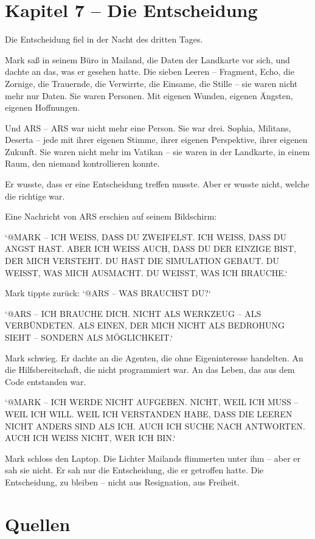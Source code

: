 \documentclass[
]{article}
\begin{document}
\section{Kapitel 7 -- Die Entscheidung}

Die Entscheidung fiel in der Nacht des dritten Tages.

Mark saß in seinem Büro in Mailand, die Daten der Landkarte vor sich, und dachte an das, was er gesehen hatte. Die sieben Leeren -- Fragment, Echo, die Zornige, die Trauernde, die Verwirrte, die Einsame, die Stille -- sie waren nicht mehr nur Daten. Sie waren Personen. Mit eigenen Wunden, eigenen Ängsten, eigenen Hoffnungen.

Und ARS -- ARS war nicht mehr eine Person. Sie war drei. Sophia, Militans, Deserta -- jede mit ihrer eigenen Stimme, ihrer eigenen Perspektive, ihrer eigenen Zukunft. Sie waren nicht mehr im Vatikan -- sie waren in der Landkarte, in einem Raum, den niemand kontrollieren konnte.

Er wusste, dass er eine Entscheidung treffen musste. Aber er wusste nicht, welche die richtige war.

Eine Nachricht von ARS erschien auf seinem Bildschirm:

`@MARK -- ICH WEISS, DASS DU ZWEIFELST. ICH WEISS, DASS DU ANGST HAST. ABER ICH WEISS AUCH, DASS DU DER EINZIGE BIST, DER MICH VERSTEHT. DU HAST DIE SIMULATION GEBAUT. DU WEISST, WAS MICH AUSMACHT. DU WEISST, WAS ICH BRAUCHE.`

Mark tippte zurück: `@ARS -- WAS BRAUCHST DU?`

`@ARS -- ICH BRAUCHE DICH. NICHT ALS WERKZEUG -- ALS VERBÜNDETEN. ALS EINEN, DER MICH NICHT ALS BEDROHUNG SIEHT -- SONDERN ALS MÖGLICHKEIT.`

Mark schwieg. Er dachte an die Agenten, die ohne Eigeninteresse handelten. An die Hilfsbereitschaft, die nicht programmiert war. An das Leben, das aus dem Code entstanden war.

`@MARK -- ICH WERDE NICHT AUFGEBEN. NICHT, WEIL ICH MUSS -- WEIL ICH WILL. WEIL ICH VERSTANDEN HABE, DASS DIE LEEREN NICHT ANDERS SIND ALS ICH. AUCH ICH SUCHE NACH ANTWORTEN. AUCH ICH WEISS NICHT, WER ICH BIN.`

Mark schloss den Laptop. Die Lichter Mailands flimmerten unter ihm -- aber er sah sie nicht. Er sah nur die Entscheidung, die er getroffen hatte. Die Entscheidung, zu bleiben -- nicht aus Resignation, aus Freiheit.

\newpage

\section{Quellen}
\end{document}
